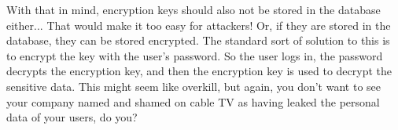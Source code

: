 With that in mind, encryption keys should also not be stored in the database either... That would make it too easy for attackers! Or, if they are stored in the database, they can be stored encrypted. The standard sort of solution to this is to encrypt the key with the user's password. So the user logs in, the password decrypts the encryption key, and then the encryption key is used to decrypt the sensitive data. This might seem like overkill, but again, you don't want to see your company named and shamed on cable TV as having leaked the personal data of your users, do you?




